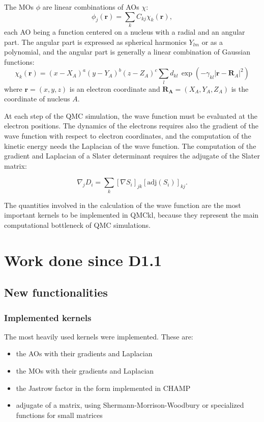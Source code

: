 The \acp{MO} $\phi$ are linear combinations of \acp{AO} $\chi$:
\begin{equation}
\phi_j(\mathbf{r}) = \sum_k C_{kj} \chi_k(\mathbf{r}),
\end{equation}
each \ac{AO} being a function centered on a nucleus with a radial and an angular part.
The angular part is expressed as spherical harmonics $Y_{lm}$ or as a polynomial, and
the angular part is generally a linear combination of Gaussian functions:
\begin{equation}
\chi_k(\mathbf{r}) = (x-X_A)^a (y-Y_A)^b (z-Z_A)^c \sum_l d_{kl}\, \exp \left(
    -\gamma_{kl} |\mathbf{r}-\mathbf{R}_A|^2 \right)
\end{equation}
where $\mathbf{r} = (x,y,z)$ is an electron coordinate and 
$\mathbf{R_A} = (X_A,Y_A,Z_A)$ is the coordinate of nucleus $A$.

At each step of the \ac{QMC} simulation, the wave function must be
evaluated at the electron positions. The dynamics of the electrons
requires also the gradient of the wave function with respect to electron
coordinates, and the computation of the kinetic energy needs the Laplacian
of the wave function. The computation of the gradient and Laplacian of
a Slater determinant requires the adjugate of the Slater matrix:

\begin{equation}
  \nabla_j D_i = \sum_k \left[\nabla S_i \right]_{jk} \left[\mathrm{adj}(S_i)\right]_{kj}.
\end{equation}


The quantities involved in the calculation of the wave function are the most
important kernels to be implemented in QMCkl, because they represent the main
computational bottleneck of \ac{QMC} simulations.


\section{Work done since D1.1}

\subsection{New functionalities}

\subsubsection{Implemented kernels}

The most heavily used kernels were implemented. These are:
\begin{itemize}
  \item the \acp{AO} with their gradients and Laplacian
  \item the \acp{MO} with their gradients and Laplacian
  \item the Jastrow factor in the form implemented in CHAMP
  \item adjugate of a matrix, using Shermann-Morrison-Woodbury or
    specialized functions for small matrices
\end{itemize}    

